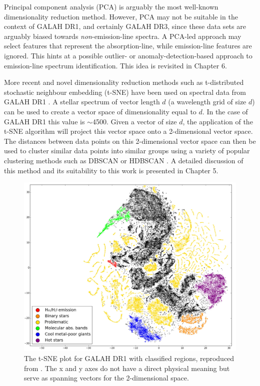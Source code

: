 Principal component analysis (PCA) is arguably the most well-known dimensionality reduction method. However, PCA may not be suitable in the context of GALAH DR1, and certainly GALAH DR3, since these data sets are arguably biased towards {\em non}-emission-line spectra. A PCA-led approach may select features that represent the absorption-line, while emission-line features are ignored. This hints at a possible outlier- or anomaly-detection-based approach to emission-line spectrum identification. This idea is revisited in Chapter 6.

More recent and novel dimensionality reduction methods such as t-distributed stochastic neighbour embedding (t-SNE) \citep{van2008visualizing} have been used on spectral data from GALAH DR1 \citep{traven2017galah}. A stellar spectrum of vector length $d$ (a wavelength grid of size $d$) can be used to create a vector space of dimensionality equal to $d$. In the case of GALAH DR1 this value is $\sim$4500. Given a vector of size $d$, the application of the t-SNE algorithm will project this vector space onto a 2-dimensional vector space. The distances between data points on this 2-dimensional vector space can then be used to cluster similar data points into similar groups using a variety of popular clustering methods such as DBSCAN \citep{ester1996density} or HDBSCAN \citep{campello2013density}. A detailed discussion of this method and its suitability to this work is presented in Chapter 5.

\begin{figure}[!htb]
\centering
\includegraphics[scale=0.36]{figures/tsne traven.png}
\caption{The t-SNE plot for GALAH DR1 with classified regions, reproduced from \citet{traven2017galah}. The x and y axes do not have a direct physical meaning but serve as spanning vectors for the 2-dimensional space.}
\label{fig2.6}
\end{figure}

